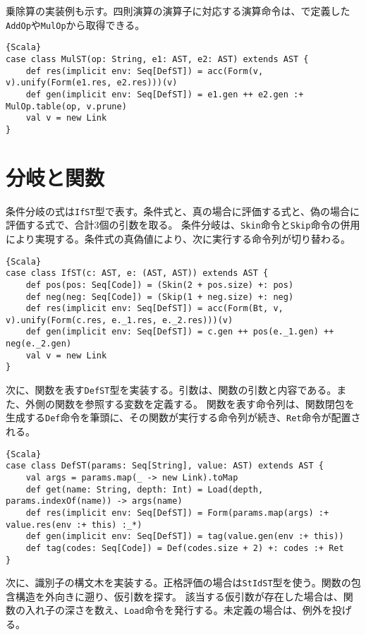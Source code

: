 \documentclass[10pt,a4paper]{book}
\begin{document}
乗除算の実装例も示す。四則演算の演算子に対応する演算命令は、で定義した\texttt{AddOp}や\texttt{MulOp}から取得できる。

\begin{Verbatim}{Scala}
case class MulST(op: String, e1: AST, e2: AST) extends AST {
	def res(implicit env: Seq[DefST]) = acc(Form(v, v).unify(Form(e1.res, e2.res)))(v)
	def gen(implicit env: Seq[DefST]) = e1.gen ++ e2.gen :+ MulOp.table(op, v.prune)
	val v = new Link
}
\end{Verbatim}

\section{分岐と関数\label{sect:CallST}}

条件分岐の式は\texttt{IfST}型で表す。条件式と、真の場合に評価する式と、偽の場合に評価する式で、合計3個の引数を取る。
条件分岐は、\texttt{Skin}命令と\texttt{Skip}命令の併用により実現する。条件式の真偽値により、次に実行する命令列が切り替わる。

\begin{Verbatim}{Scala}
case class IfST(c: AST, e: (AST, AST)) extends AST {
	def pos(pos: Seq[Code]) = (Skin(2 + pos.size) +: pos)
	def neg(neg: Seq[Code]) = (Skip(1 + neg.size) +: neg)
	def res(implicit env: Seq[DefST]) = acc(Form(Bt, v, v).unify(Form(c.res, e._1.res, e._2.res)))(v)
	def gen(implicit env: Seq[DefST]) = c.gen ++ pos(e._1.gen) ++ neg(e._2.gen)
	val v = new Link
}
\end{Verbatim}

次に、関数を表す\texttt{DefST}型を実装する。引数は、関数の引数と内容である。また、外側の関数を参照する変数を定義する。
関数を表す命令列は、関数閉包を生成する\texttt{Def}命令を筆頭に、その関数が実行する命令列が続き、\texttt{Ret}命令が配置される。

\begin{Verbatim}{Scala}
case class DefST(params: Seq[String], value: AST) extends AST {
	val args = params.map(_ -> new Link).toMap
	def get(name: String, depth: Int) = Load(depth, params.indexOf(name)) -> args(name)
	def res(implicit env: Seq[DefST]) = Form(params.map(args) :+ value.res(env :+ this) :_*)
	def gen(implicit env: Seq[DefST]) = tag(value.gen(env :+ this))
	def tag(codes: Seq[Code]) = Def(codes.size + 2) +: codes :+ Ret
}
\end{Verbatim}

次に、識別子の構文木を実装する。正格評価の場合は\texttt{StIdST}型を使う。関数の包含構造を外向きに遡り、仮引数を探す。
該当する仮引数が存在した場合は、関数の入れ子の深さを数え、\texttt{Load}命令を発行する。未定義の場合は、例外を投げる。
\end{document}
